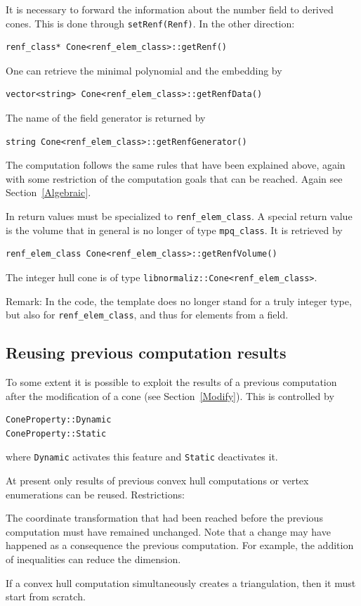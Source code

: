 \begin{small}
It is necessary to forward the information about the number field to derived cones. This is done through \verb*|setRenf(Renf)|. In the other direction:
\begin{Verbatim}
renf_class* Cone<renf_elem_class>::getRenf()
\end{Verbatim}

One can retrieve the minimal polynomial and the embedding by
\begin{Verbatim}
vector<string> Cone<renf_elem_class>::getRenfData()
\end{Verbatim}
The name of the field generator is returned by
\begin{Verbatim}
string Cone<renf_elem_class>::getRenfGenerator()
\end{Verbatim}

The computation follows the same rules that have been explained above, again with some restriction of the computation goals that can be reached. Again see Section~\ref{Algebraic}.

In return values  must be specialized to \verb|renf_elem_class|. A special return value is the volume that in general is no longer of type \verb|mpq_class|. It is retrieved by
\begin{Verbatim}
renf_elem_class Cone<renf_elem_class>::getRenfVolume() 
\end{Verbatim}

The integer hull cone is of type \verb|libnormaliz::Cone<renf_elem_class>|.

Remark: In the code, the template  does no longer stand for a truly integer type, but also for \verb|renf_elem_class|, and thus for elements from a field.

\subsection{Reusing previous computation results}

To some extent it is possible to exploit the results of a previous computation after the modification of a cone (see Section~\ref{Modify}). This is controlled by
\begin{Verbatim}
ConeProperty::Dynamic
ConeProperty::Static
\end{Verbatim}
where \verb|Dynamic| activates this feature and \verb|Static| deactivates it.

At present only results of previous convex hull computations or vertex enumerations can be reused. Restrictions:
\begin{arab}
	\item The coordinate transformation that had been reached before the previous computation must have remained unchanged. Note that a change may have happened as a consequence the previous computation. For example, the addition of inequalities can reduce the dimension.
	\item If a convex hull computation simultaneously creates a triangulation, then it must start from scratch.
\end{arab}


\end{small}
